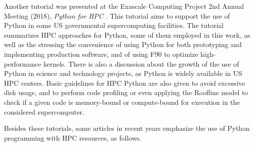 Another tutorial was presented at the Exascale Computing Project 2nd Annual Meeting (2018), \textit {Python for HPC} \cite {Scullin2018}. This tutorial aims to support the use of Python in some US governmental supercomputing facilities. The tutorial summarizes HPC approaches for Python, some of them employed in this work, as well as the stressing the convenience of using Python for both prototyping and implementing production software, and of using F90 to optimize high-performance kernels. There is also a discussion about the growth of the use of Python in science and technology projects, as Python is widely available in US HPC centers. Basic guidelines for HPC Python are also given to avoid excessive disk usage, and to perform code profiling or even applying the Roofline model to check if a given code is memory-bound or compute-bound for execution in the considered supercomputer.

Besides these tutorials, some articles in recent years emphasize the use of Python programming with HPC resources, as follows. 

